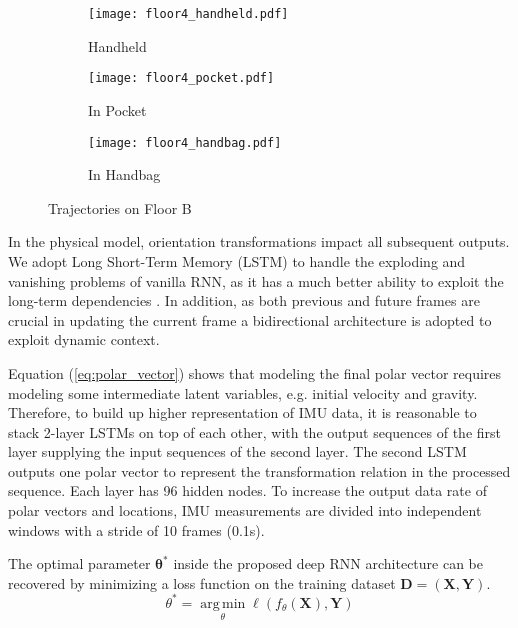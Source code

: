 \documentclass[letterpaper]{article}
\begin{document}
    \begin{figure*}
    	\centering
        \begin{subfigure}[t]{0.3\textwidth}
        	\texttt{[image: floor4\_handheld.pdf]}
        	\caption{\label{fig:floor4_hand_phones} Handheld}
        \end{subfigure}
        \begin{subfigure}[t]{0.3\textwidth}
        	\texttt{[image: floor4\_pocket.pdf]}
        	\caption{\label{fig:floor4_pocket_phones} In Pocket}
        \end{subfigure}
        \begin{subfigure}[t]{0.3\textwidth}
        	\texttt{[image: floor4\_handbag.pdf]}
        	\caption{\label{fig:floor4_handbag_phones} In Handbag}
        \end{subfigure}
        \caption{\label{fig:floor4} Trajectories on Floor B}
    \end{figure*}

	In the physical model, orientation transformations impact all subsequent outputs. We adopt Long Short-Term Memory (LSTM) to handle the exploding and vanishing problems of vanilla RNN, as it has a much better ability to exploit the long-term dependencies \cite{Greff2016}. In addition, as both previous and future frames are crucial in updating the current frame a bidirectional architecture is adopted to exploit dynamic context.
      
	Equation (\ref{eq:polar_vector}) shows that modeling the final polar vector requires modeling some intermediate latent variables, e.g. initial velocity and gravity. Therefore, to build up higher representation of IMU data, it is reasonable to stack 2-layer LSTMs on top of each other, with the output sequences of the first layer supplying the input sequences of the second layer. The second LSTM outputs one polar vector to represent the transformation relation in the processed sequence. Each layer has 96 hidden nodes. To increase the output data rate of polar vectors and locations, IMU measurements are divided into independent windows with a stride of 10 frames (0.1s).
    
	The optimal parameter $\mathbf{\theta}^*$ inside the proposed deep RNN architecture can be recovered by minimizing a loss function on the training dataset $\mathbf{D}=(\mathbf{X},\mathbf{Y})$.   
    \begin{equation}
    	\theta^*= \operatorname*{arg\, min}_{\theta} \ell(f_{\theta}(\mathbf{X}),\mathbf{Y})
    \end{equation}
\end{document}
